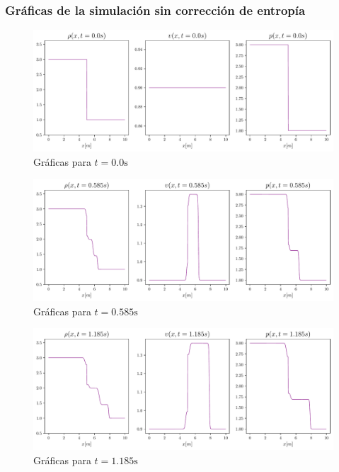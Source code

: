 \subsubsection{Gráficas de la simulación sin corrección de entropía}
\begin{figure}[ht]
	\centering
	\includegraphics[width=1\linewidth]{../euler1D/plots_en_TDG/set3/leveque_sin_entropy714/1.pdf}
	\caption{Gráficas para $t=0.0\unit{\s}$}
\end{figure}
\begin{figure}[ht]
	\includegraphics[width=1\linewidth]{../euler1D/plots_en_TDG/set3/leveque_sin_entropy714/60.pdf}
	\caption{Gráficas para $t=0.585\unit{\s}$}
\end{figure}
\begin{figure}[ht]
	\includegraphics[width=1\linewidth]{../euler1D/plots_en_TDG/set3/leveque_sin_entropy714/120.pdf}
	\caption{Gráficas para $t=1.185\unit{\s}$}
\end{figure}
\clearpage

